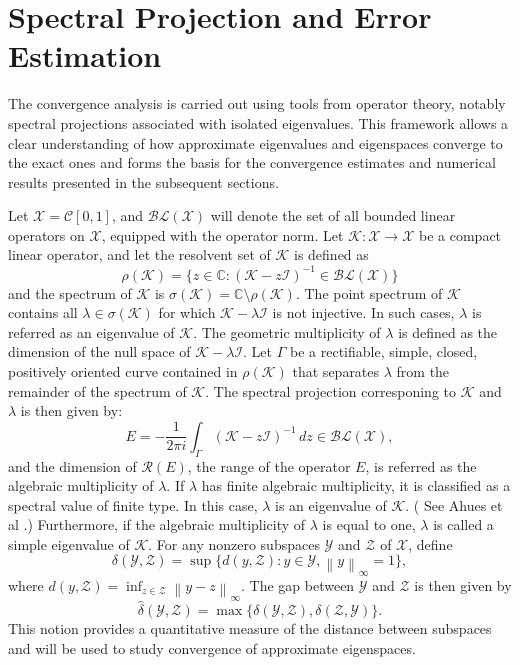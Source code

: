 \documentclass[]{interact}
\theoremstyle{plain}%
\theoremstyle{definition}
\theoremstyle{remark}
\newcommand{\norm}[1]{\left\lVert #1\right\rVert}
\begin{document}
\section{Spectral Projection and Error Estimation} \label{ep_spectral_projection}

The convergence analysis is carried out using tools from operator theory, notably spectral projections associated with isolated eigenvalues. This framework allows a clear understanding of how approximate eigenvalues and eigenspaces converge to the exact ones and forms the basis for the convergence estimates and numerical results presented in the subsequent sections.

Let $\mathcal{X} = \mathcal{C}[0,1]$, and $\mathcal{BL}(\mathcal{X})$ will denote the set of all bounded linear operators on $\mathcal{X}$, equipped with the operator norm. Let  $\mathcal{K} : \mathcal{X} \to \mathcal{X}$ be a compact linear operator, and let the resolvent set of $\mathcal{K}$ is defined as 
\[
\rho(\mathcal{K}) = \{ z \in \mathbb{C} : (\mathcal{K} - z\mathcal{I})^{-1} \in \mathcal{BL}(\mathcal{X}) \}
\]
and the spectrum of $\mathcal{K}$ is $\sigma(\mathcal{K}) = \mathbb{C} \setminus \rho(\mathcal{K})$. The point spectrum of $\mathcal{K}$ contains all $\lambda \in \sigma(\mathcal{K})$ for which $\mathcal{K} - \lambda \mathcal{I}$ is not injective. In such cases, $\lambda$ is referred as an eigenvalue of $\mathcal{K}$. The geometric multiplicity of $\lambda$ is defined as the dimension of the null space of $\mathcal{K} - \lambda \mathcal{I}$. Let $\Gamma$ be a rectifiable, simple, closed, positively oriented curve contained in $\rho(\mathcal{K})$ that separates $\lambda$ from the remainder of the spectrum of $\mathcal{K}$. The spectral projection corresponing to  $\mathcal{K}$ and $\lambda$ is then given by:
\[
E = -\frac{1}{2\pi i} \int_{\Gamma} (\mathcal{K} - z\mathcal{I})^{-1} \, dz \in  \mathcal{BL}(\mathcal{X}),
\]
and the dimension of $\mathcal{R}(E)$, the range of the operator $E$, is referred as the algebraic multiplicity of $\lambda$. If $\lambda$ has finite algebraic multiplicity, it is classified as a spectral value of finite type. In this case, $\lambda$ is an eigenvalue of $\mathcal{K}$. ( See Ahues et al \cite[Proposition 1.31]{Ahues}.) Furthermore, if the algebraic multiplicity of $\lambda$ is equal to one, $\lambda$ is called a simple eigenvalue of $\mathcal{K}$. For any nonzero subspaces $\mathcal{Y}$ and $\mathcal{Z}$ of $\mathcal{X}$, define 
\[
\delta(\mathcal{Y}, \mathcal{Z}) = \sup \{d(y, \mathcal{Z}) : y \in \mathcal{Y}, \norm{y}_\infty = 1\},
\]
where $d(y, \mathcal{Z}) = \inf_{z \in \mathcal{Z}} \norm{y - z}_\infty$. The gap between $\mathcal{Y}$ and $\mathcal{Z}$ is then given by  
\[
\hat{\delta}(\mathcal{Y}, \mathcal{Z}) = \max\{\delta(\mathcal{Y}, \mathcal{Z}), \delta(\mathcal{Z}, \mathcal{Y})\}.
\]	
This notion provides a quantitative measure of the distance between
subspaces and will be used to study convergence of approximate
eigenspaces.
\end{document}
